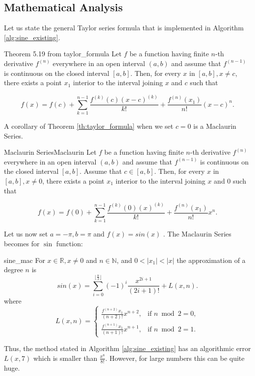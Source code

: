 \documentclass[12pt]{article}
\begin{document}
\subsection{Mathematical Analysis}
Let us state the general Taylor series formula that is implemented in Algorithm \ref{alg:sine_existing}.
\begin{TheoremColor}{Theorem 5.19 from }{taylor_formula}
    Let $f$ be a function having finite $n$-th derivative $f^{(n)}$
    everywhere in an open interval $(a, b)$ and assume that  $f^{(n-1)}$ is continuous on the closed interval $[a, b]$. Then, for every $x$ in $[a, b], x\neq c$, there exists a point $x_1$ interior to the interval joining $x$ and $c$ such that

    \begin{equation*}
        f(x) = f(c) + \sum_{k=1}^{n-1} \frac{f^{(k)}(c)(x-c)^{(k)}}{k!} + \frac{f^{(n)}(x_1)}{n!} (x - c)^n.
    \end{equation*}
\end{TheoremColor}
A corollary of Theorem \ref{th:taylor_formula} when we set $c = 0$ is a Maclaurin Series.
\begin{CorollaryColor}{Maclaurin Series}{Maclaurin}
    Let $f$ be a function having finite $n$-th derivative $f^{(n)}$
    everywhere in an open interval $(a, b)$ and assume that  $f^{(n-1)}$ is continuous on the closed interval $[a, b]$. Assume that $c \in [a, b]$. Then, for every $x$ in $[a, b], x\neq 0$, there exists a point $x_1$ interior to the interval joining $x$ and $0$ such that

    \begin{equation*}
        f(x) = f(0) + \sum_{k=1}^{n-1} \frac{f^{(k)}(0)(x)^{(k)}}{k!} + \frac{f^{(n)}(x_1)}{n!} x^n.
    \end{equation*}
\end{CorollaryColor}
Let us now set $a = -\pi, b= \pi$ and $f(x) = sin(x)$ .
The Maclaurin Series becomes for $\sin$ function:
\begin{CorollaryColor}{}{sine_mac}
    For $x \in \mathbb{R}, x\neq 0$ and $n \in \mathbb{N}$, and $0 < |x_1| < |x|$
    the approximation of a degree $n$ is
    \begin{equation*}
        sin(x) = \sum_{i=0}^{\lfloor\frac{n}{2}\rfloor}
        \left(-1\right)^{ i} \frac{x^{2i + 1}}{(2i+1)!}   +  L(x, n).
    \end{equation*}
    where
    \begin{equation*}
        L(x, n) = \begin{cases}
            \frac{f^{(n + 2)}x_1}{(n+2)!}x^{n+2}, & \text{if } n \bmod 2 = 0,  \\
            \frac{f^{(n + 1)}x_1}{(n+1)!}x^{n+1}, & \text{if } n \bmod 2 = 1.
          \end{cases}
    \end{equation*}
\end{CorollaryColor}
Thus, the method stated in Algorithm \ref{alg:sine_existing} has an algorithmic error $L(x, 7)$ which is smaller than $\frac{x^8}{8!}$. However, for large numbers this can be quite huge.
\end{document}
